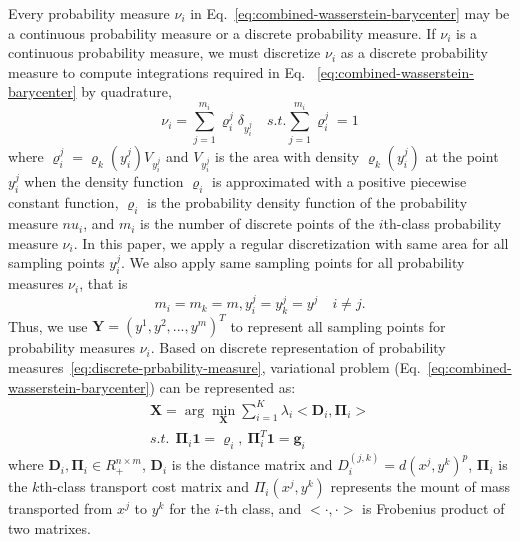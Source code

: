 Every probability measure $\nu_i$ in Eq.~\ref{eq:combined-wasserstein-barycenter} may be a continuous probability measure or a discrete probability measure.
If $\nu_i$ is a continuous probability measure,
we must discretize  $\nu_i$ as a discrete probability measure
to compute integrations required in Eq. ~\ref{eq:combined-wasserstein-barycenter} by quadrature,
\begin{equation}\label{eq:discrete-prbability-measure}
\nu_i=\sum\limits_{j=1}^{m_i}\varrho_i^j\delta_{y_i^j} \quad s.t. \sum\limits_{j=1}^{m_i}\varrho_i^j=1
\end{equation}
where $\varrho_i^j=\varrho_k(y_i^j)V_{y_i^j}$
and $V_{y_i^j}$ is the area with density $\varrho_k(y_i^j)$ at the point $y_i^j$ when the density function
$\varrho_i$ is approximated with a positive piecewise constant function,
$\varrho_i$ is the probability density function of the probability measure $nu_i$,
and $m_i$ is the number of discrete points of the $i$th-class probability measure $\nu_i$.
In this paper,
we apply a regular discretization with same area for all sampling points $y_i^j$.
We also apply same sampling points for all probability measures $\nu_i$, that is
\begin{equation*}
m_i=m_k=m, y_i^j=y_k^j=y^j \quad{i\neq j}.
\end{equation*}
Thus, we use $\mathbf{Y}=(y^1,y^2,...,y^m)^T$ to represent all sampling points for probability measures $\nu_i$.
Based on discrete representation of probability measures~\ref{eq:discrete-prbability-measure},
variational problem (Eq.~\ref{eq:combined-wasserstein-barycenter}) can be represented as:
\begin{equation}\label{eq:discrete-multi-problem}
  \begin{aligned}
  \mathbf{X}=\arg\min\limits_{\mathbf{X}}\sum\limits_{i=1}^K\lambda_i<\mathbf{D}_i,\mathbf{\Pi}_i> \\
    s.t.\ \ \mathbf{\Pi}_i\mathbf{1}=\mathbf{\varrho}_i,\ \mathbf{\Pi}_i^T\mathbf{1}=\mathbf{g}_i
  \end{aligned}
\end{equation}
where
 $\mathbf{D}_i,\mathbf{\Pi}_i\in R_+^{n\times m}$,
 $\mathbf{D}_i$ is the distance matrix and $D_i^{(j,k)}=d(x^j,y^k)^p$,
 $\mathbf{\Pi}_i$ is the $k$th-class transport cost matrix and $\Pi_i(x^j,y^k)$ represents the mount of mass transported from $x^j$ to $y^k$ for the $i$-th class,
 and $<\cdot,\cdot>$ is Frobenius product of two matrixes.

